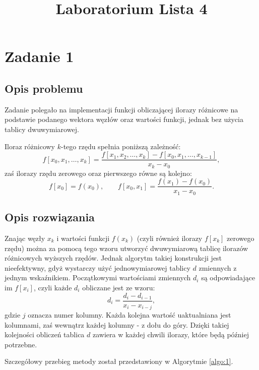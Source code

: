 \documentclass{classrep}
\author{
  \studentinfo{Agata Jasionowska}{229726}
}
\title{Laboratorium \ppauza Lista 4}
\begin{document}
\maketitle

\section{Zadanie 1}
	\subsection{Opis problemu}
		Zadanie polegało na implementacji funkcji obliczającej ilorazy różnicowe na podstawie podanego wektora węzłów oraz wartości funkcji, jednak bez użycia tablicy dwuwymiarowej.
		
		Iloraz różnicowy $k$-tego rzędu spełnia poniższą zależność:
		$$f[x_0,x_1, \ldots, x_k] = \frac{f[x_1,x_2, \ldots, x_k] - f[x_0, x_1, \ldots, x_{k-1}]}{x_k - x_0},$$
		zaś ilorazy rzędu zerowego oraz pierwszego równe są kolejno:
		$$f[x_0] = f(x_0), \qquad f[x_0,x_1] = \frac{f(x_1) - f(x_0)}{x_1 - x_0}.$$
		
	
	\subsection{Opis rozwiązania}
		Znając węzły $x_k$ i wartości funkcji $f(x_k)$ (czyli również ilorazy $f[x_k]$ zerowego rzędu) można za pomocą tego wzoru utworzyć dwuwymiarową tablicę ilorazów różnicowych wyższych rzędów. Jednak algorytm takiej konstrukcji jest nieefektywny, gdyż wystarczy użyć jednowymiarowej tablicy $d$ zmiennych z jednym wskaźnikiem. Początkowymi wartościami zmiennych $d_i$ są odpowiadające im $f[x_i]$, czyli każde $d_i$ obliczane jest ze wzoru:
		$$d_i = \frac{d_i-d_{i-1}}{x_i-x_{i-j}}, $$	
		gdzie $j$ oznacza numer kolumny.	
		Każda kolejna wartość uaktualniana jest kolumnami, zaś wewnątrz każdej kolumny - z dołu do góry. Dzięki takiej kolejności obliczeń tablica $d$ zawiera w każdej chwili ilorazy, które będą później potrzebne. 
		
		Szczegółowy przebieg metody został przedstawiony w Algorytmie \ref{algo:1}.
		
\end{document}

